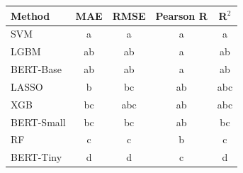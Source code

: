 \begin{tabular}{lcccc}
\toprule
Method & MAE & RMSE & Pearson R & R$^2$ \\
\midrule
SVM & a & a & a & a \\
LGBM & ab & ab & a & ab \\
BERT-Base & ab & ab & a & ab \\
LASSO & b & bc & ab & abc \\
XGB & bc & abc & ab & abc \\
BERT-Small & bc & bc & ab & bc \\
RF & c & c & b & c \\
BERT-Tiny & d & d & c & d \\
\bottomrule
\end{tabular}

